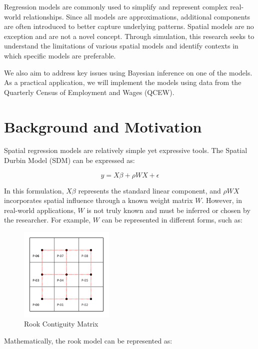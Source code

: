 \documentclass{article}
\begin{document}
Regression models are commonly used to simplify and represent complex real-world relationships. Since all models are approximations, additional components are often introduced to better capture underlying patterns. Spatial models are no exception and are not a novel concept. Through simulation, this research seeks to understand the limitations of various spatial models and identify contexts in which specific models are preferable.

We also aim to address key issues using Bayesian inference on one of the models. As a practical application, we will implement the models using data from the Quarterly Census of Employment and Wages (QCEW).

\section{Background and Motivation}

Spatial regression models are relatively simple yet expressive tools. The Spatial Durbin Model (SDM) can be expressed as:

\begin{equation}
	y = X \beta + \rho W X + \epsilon
\end{equation}

In this formulation, $X \beta$ represents the standard linear component, and $\rho W X$ incorporates spatial influence through a known weight matrix $W$. However, in real-world applications, $W$ is not truly known and must be inferred or chosen by the researcher. For example, $W$ can be represented in different forms, such as:

\begin{figure}[H]
	\centering
	\includegraphics[width=0.4\textwidth]{assets/rook.png}
	\caption{Rook Contiguity Matrix}
\end{figure}

Mathematically, the rook model can be represented as:
\end{document}
